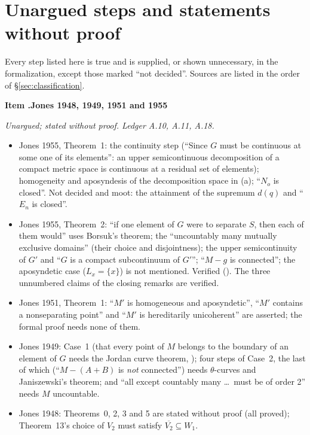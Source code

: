 \documentclass[11pt]{article}
\newcounter{defect}
\newenvironment{defect}[4]{%
  \par\addvspace{10pt}\refstepcounter{defect}%
  \noindent\textbf{Item \thedefect.\enspace #1}\par\nopagebreak
  \noindent\textit{#2}\par\nopagebreak\smallskip}{\par\addvspace{6pt}}
\begin{document}
\section{Unargued steps and statements without proof}\label{sec:unargued}

Every step listed here is true and is supplied, or shown unnecessary, in the formalization,
except those marked ``not decided''. Sources are
listed in the order of \S\ref{sec:classification}.

\begin{defect}{Jones 1948, 1949, 1951 and 1955}{Unargued; stated without proof. Ledger A.10, A.11,
A.18.}{0}{0}\label{it:un-jones}
\begin{itemize}
\item Jones 1955, Theorem~1: the continuity step (``Since $G$ must be continuous at some one of its
  elements'': an upper semicontinuous decomposition of a compact metric space is continuous at a
  residual set of elements); homogeneity and aposyndesis of the decomposition space in (a); ``$N_o$
  is closed''. Not decided and moot: the attainment of the supremum $d(q)$ and ``$E_n$ is closed''.
\item Jones 1955, Theorem~2: ``if one element of $G$ were to separate $S$, then each of them
  would'' uses Borsuk's theorem; the ``uncountably many mutually exclusive domains'' (their choice
  and disjointness); the upper semicontinuity of $G'$ and ``$G$ is a compact subcontinuum of $G'$'';
  ``$M-g$ is connected''; the aposyndetic case ($L_x=\{x\}$) is not mentioned. Verified
  (). The three unnumbered claims of the closing remarks are verified.
\item Jones 1951, Theorem~1: ``$M'$ is homogeneous and aposyndetic'', ``$M'$ contains a
  nonseparating point'' and ``$M'$ is hereditarily unicoherent'' are asserted; the formal proof
  needs none of them.
\item Jones 1949: Case~1 (that every point of $M$ belongs to the boundary of an element of $G$ needs
  the Jordan curve theorem, ); four steps of Case~2, the last of which
  (``$M-(A+B)$ is \emph{not} connected'') needs $\theta$-curves and Janiszewski's theorem; and
  ``all except countably many \ldots\ must be of order 2'' needs $M$ uncountable.
\item Jones 1948: Theorems~0, 2, 3 and 5 are stated without proof (all proved); Theorem~13's choice
  of $V_2$ must satisfy $\overline{V_2}\subseteq W_1$.
\end{itemize}
\end{defect}
\end{document}
